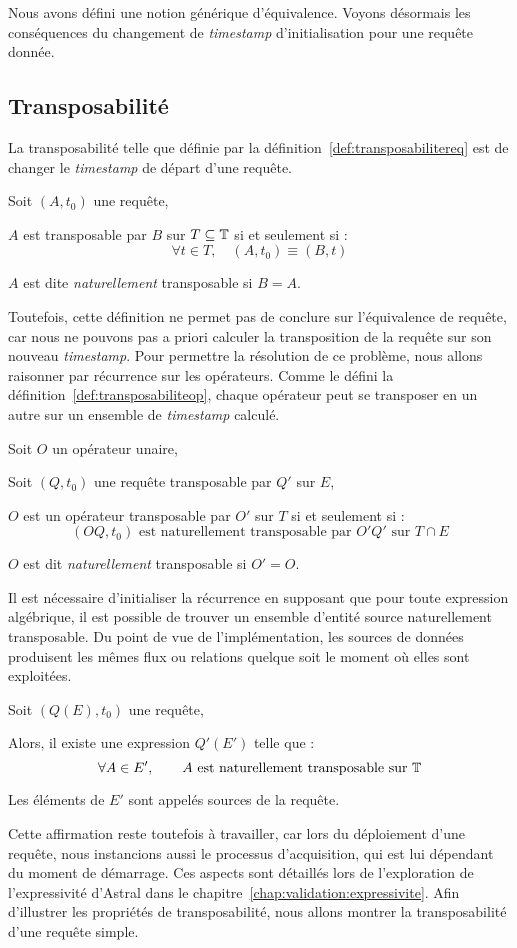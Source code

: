 Nous avons défini une notion générique d'équivalence. Voyons désormais les conséquences du changement de \textit{timestamp} d'initialisation pour une requête donnée.
\subsection{Transposabilité}
La transposabilité telle que définie par la définition~\ref{def:transposabilitereq} est de changer le \textit{timestamp} de départ d'une requête.
\begin{defi}\label{def:transposabilitereq}
    Soit $(A,t_0)$ une requête,

    $A$ est transposable par $B$ sur $T\subseteq \mathbb{T}$ si et seulement si : $$\forall t\in T, \quad (A,t_0) \equiv (B,t)$$

    $A$ est dite \textit{naturellement} transposable si $B=A$.
\end{defi}

Toutefois, cette définition ne permet pas de conclure sur l'équivalence de requête, car nous ne pouvons pas a priori calculer la transposition de la requête sur son nouveau \textit{timestamp}. Pour permettre la résolution de ce problème, nous allons raisonner par récurrence sur les opérateurs. Comme le défini la définition~\ref{def:transposabiliteop}, chaque opérateur peut se transposer en un autre sur un ensemble de \textit{timestamp} calculé.
\begin{defi}\label{def:transposabiliteop}
    Soit $O$ un opérateur unaire,

    Soit $(Q,t_0)$ une requête transposable par $Q'$ sur $E$,

    $O$ est un opérateur transposable par $O'$ sur $T$ si et seulement si : $$(OQ,t_0) \textrm{ est naturellement transposable par } O'Q' \textrm{ sur } T\cap E$$

    $O$ est dit \textit{naturellement} transposable si $O'=O$.
\end{defi}

Il est nécessaire d'initialiser la récurrence en supposant que pour toute expression algébrique, il est possible de trouver un ensemble d'entité source naturellement transposable. Du point de vue de l'implémentation, les sources de données produisent les mêmes flux ou relations quelque soit le moment où elles sont exploitées.
\begin{hyp}\label{hyp:transposabilite}
    Soit $(Q(E),t_0)$ une requête,

    Alors, il existe une expression $Q'(E')$ telle que : $$\forall A\in E', \qquad A \textrm{ est naturellement transposable sur } \mathbb{T}$$
    
    Les éléments de $E'$ sont appelés sources de la requête.
\end{hyp}
Cette affirmation reste toutefois à travailler, car lors du déploiement d'une requête, nous instancions aussi le processus d'acquisition, qui est lui dépendant du moment de démarrage. Ces aspects sont détaillés lors de l'exploration de l'expressivité d'Astral dans le chapitre~\ref{chap:validation:expressivite}. Afin d'illustrer les propriétés de transposabilité, nous allons montrer la transposabilité d'une requête simple.

